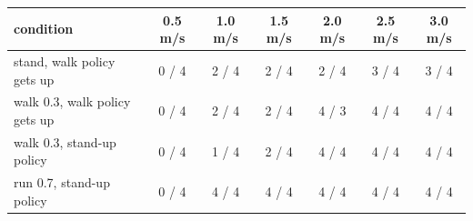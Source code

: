 \begin{tabular}{lcccccc}\toprule
condition & 0.5 m/s & 1.0 m/s & 1.5 m/s & 2.0 m/s & 2.5 m/s & 3.0 m/s \\\midrule
stand, walk policy gets up & 0 / 4 & 2 / 4 & 2 / 4 & 2 / 4 & 3 / 4 & 3 / 4 \\
walk 0.3, walk policy gets up & 0 / 4 & 2 / 4 & 2 / 4 & 4 / 3 & 4 / 4 & 4 / 4 \\
walk 0.3, stand-up policy & 0 / 4 & 1 / 4 & 2 / 4 & 4 / 4 & 4 / 4 & 4 / 4 \\
run 0.7, stand-up policy & 0 / 4 & 4 / 4 & 4 / 4 & 4 / 4 & 4 / 4 & 4 / 4 \\
\bottomrule\end{tabular}
